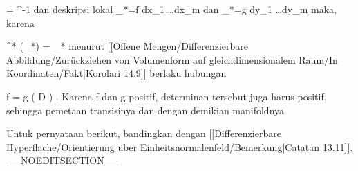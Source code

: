 {\mavergleichskette
{\vergleichskette
{ \psi
}
{ = }{ \beta \circ \alpha^{-1}
}
{  }{
}
{    }{
}
{   }{
}
}
{}{}{}
dan deskripsi lokal
\mathkor {} {\alpha_*\omega =f dx_1 \wedge \ldots \wedge dx_m} {dan} {\beta_*\omega =g dy_1 \wedge \ldots \wedge dy_m} {}
maka, karena

\mavergleichskette
{\vergleichskette
{ \psi^* (\beta_*\omega)
}
{ = }{ \alpha_* \omega
}
{  }{
}
{    }{
}
{   }{
}
}
{}{}{}
menurut [[Offene Mengen/Differenzierbare Abbildung/Zurückziehen von Volumenform auf gleichdimensionalem Raum/In Koordinaten/Fakt|Korolari 14.9]] berlaku hubungan

\mavergleichskette
{\vergleichskette
{ f
}
{ = }{ g \circ \psi \det  \left(  D  \psi  \right)
}
{  }{
}
{    }{
}
{   }{
}
}
{}{}{.}
Karena
\mathkor {} {f} {dan} {g} {}
positif, determinan tersebut juga harus positif, sehingga pemetaan transisinya
dan dengan demikian manifoldnya

}


Untuk pernyataan berikut, bandingkan dengan
[[Differenzierbare Hyperfläche/Orientierung über Einheitsnormalenfeld/Bemerkung|Catatan 13.11]].
__NOEDITSECTION__

